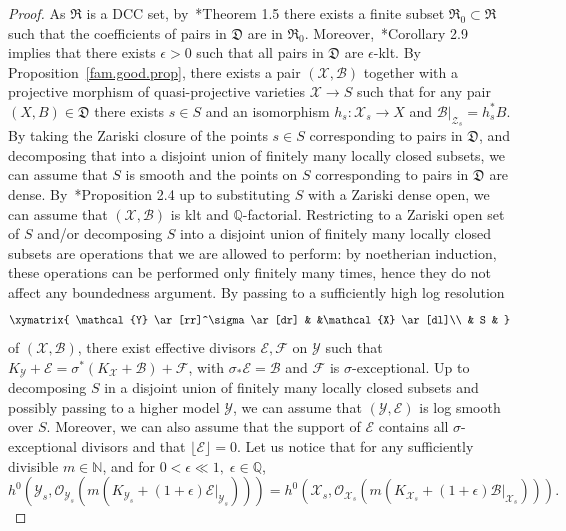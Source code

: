 \documentclass[11pt]{ip-journal}
\theoremstyle{definition}
\begin{document}
\begin{proof}
As $\mathfrak{R}$ is a DCC set, by~\cite{MR3224718}*{Theorem 1.5} there exists a finite subset $\mathfrak{R}_0 \subset \mathfrak{R}$ such that the coefficients of pairs in $\mathfrak{D}$ are in $\mathfrak{R}_0$.
Moreover,~\cite{DCS}*{Corollary 2.9} implies that there exists $\epsilon >0$ such that all pairs in $\mathfrak{D}$ are $\epsilon$-klt.
By Proposition~\ref{fam.good.prop}, there exists a pair $(\mathcal{X}, \mathcal{B})$ together with a projective morphism of quasi-projective varieties $\mathcal{X} \to S$ such that for any pair $(X, B) \in \mathfrak{D}$ there exists $s \in S$ and an isomorphism $h_s \colon \mathcal{X}_s \to X$ and $\mathcal{B}|_{\mathcal{Z}_s} = h^\ast_s B$.
By taking the Zariski closure of the points $s \in S$ corresponding to pairs in $\mathfrak{D}$, and decomposing that into a disjoint union of finitely many locally closed subsets, we can assume that $S$ is smooth and the points on $S$ corresponding to pairs in $\mathfrak{D}$ are dense.
By~\cite{MR3507257}*{Proposition 2.4} up to substituting $S$ with a Zariski dense open, we can assume that $(\mathcal{X}, \mathcal{B})$ is klt and $\mathbb{Q}$-factorial.
Restricting to a Zariski open set of $S$ and/or decomposing $S$ into a disjoint union of finitely many locally closed subsets are operations that we are allowed to perform: by noetherian induction, these operations can be performed only finitely many times, hence they do not affect any boundedness argument.
\newline
By passing to a sufficiently high log resolution 
\[
\xymatrix{
\mathcal{Y} \ar[rr]^\sigma \ar[dr] & &\mathcal{X} \ar[dl]\\
& S &
}
\]
of $(\mathcal{X}, \mathcal{B})$, there exist effective divisors $\mathcal E, \mathcal F$ on $\mathcal Y$ such that $K_\mathcal{Y} + \mathcal{E}=\sigma^\ast(K_\mathcal{X}+ \mathcal{B}) + \mathcal{F}$, with $\sigma_\ast \mathcal E= \mathcal B$ and $\mathcal{F}$ is $\sigma$-exceptional. 
Up to decomposing $S$ in a disjoint union of finitely many locally closed subsets and possibly passing to a higher model $\mathcal{Y}$, we can assume that $(\mathcal{Y}, \mathcal{E})$ is log smooth over $S$.
Moreover, we can also assume that the support of $\mathcal E$ contains all $\sigma$-exceptional divisors and that $\lfloor \mathcal E \rfloor =0$.
\newline
Let us notice that for any sufficiently divisible $m \in \mathbb{N}$, and for $0<\epsilon \ll 1, \; \epsilon \in \mathbb{Q}$, 
\[ 
h^0(\mathcal{Y}_s, \mathcal{O}_{\mathcal{Y}_s}(m(K_{\mathcal{Y}_s} +(1+\epsilon) \mathcal{E}|_{\mathcal{Y}_s}))) =  h^0(\mathcal{X}_s, \mathcal{O}_{\mathcal{X}_s}(m(K_{\mathcal{X}_s} +(1+\epsilon) \mathcal{B}|_{\mathcal{X}_s}))).
\]
\end{proof}
\end{document}
